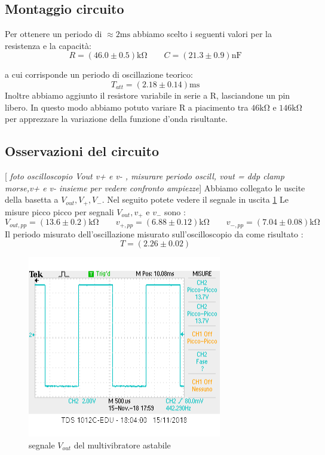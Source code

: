\documentclass[10pt,a4paper]{article}
\newcommand{\rem}[1]{[\emph{#1}]}
\begin{document}
\subsection{Montaggio circuito}
Per ottenere un periodo di $\approx 2 \si{\milli\second}$ abbiamo scelto i seguenti valori per la resistenza e la capacità:
\[ R = ( 46.0 \pm0.5 )\si{\kilo\ohm} \qquad   C = (21.3\pm0.9 )\si{\nano \farad}\]

a cui corrisponde un periodo di oscillazione teorico:
\[T_{att}= (2.18\pm 0.14 )\si{\milli \second}\]
Inoltre abbiamo aggiunto il resistore variabile in serie a R, lasciandone un pin libero. In questo modo abbiamo potuto variare R a piacimento tra $46 \si{\kilo\ohm}$ e $146 \si{\kilo\ohm}$ per apprezzare la variazione della funzione d'onda risultante.


\subsection{Osservazioni del circuito}
 \rem{ foto oscilloscopio Vout v+ e v- , misurare periodo oscill,  vout = ddp clamp morse,v+ e v- insieme per vedere confronto ampiezze}
 Abbiamo collegato le uscite della basetta a $V_{out}, V_{+}, V_{-}$. Nel seguito potete vedere il segnale in uscita \ref{fig:V_out}
Le misure picco picco per  segnali  $V_{out}, v_{+}$ e $v_{-}$ sono :
\[ V_{out,pp}= (13.6\pm 0.2)\si{\kilo\ohm} \qquad  v_{+,pp}= (6.88 \pm 0.12)\si{\kilo\ohm} \qquad   v_{-,pp}= ( 7.04 \pm0.08 ) \si{\kilo\ohm}\]
Il periodo misurato dell'oscillazione misurato sull'oscilloscopio da come risultato :
\[ T = (2.26 \pm 0.02)\]




\begin{figure}[h]
	\begin{center}
		\includegraphics[scale=0.8]{vout_punto2.png}
		\caption{\small segnale $V_{out}$ del multivibratore astabile }
		\label{fig:V_out}
	\end{center}
	
\end{figure}
\end{document}

